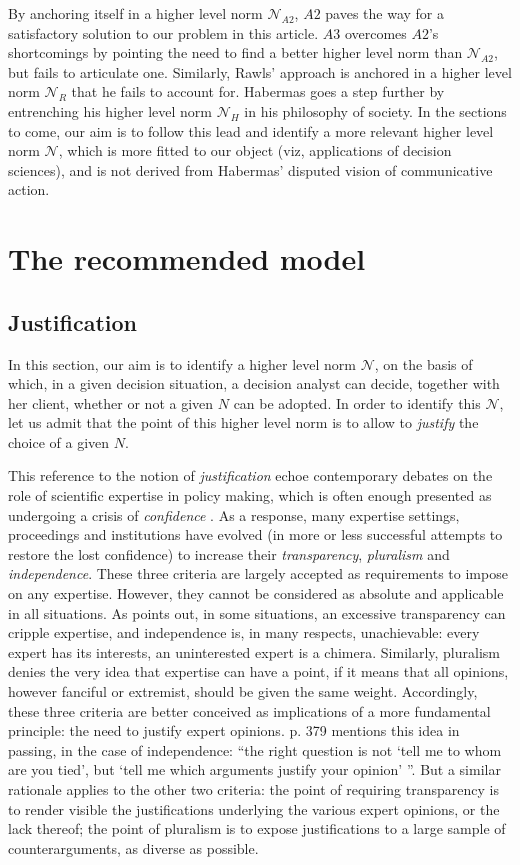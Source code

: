 \documentclass[preprint, french, english, 11pt, authoryear]{elsarticle}%
\newcommand{\adv}{\mathscr{N}}
\begin{document}
By anchoring itself in a higher level norm $\mathscr{N}_{A2}$, $A2$ paves the way for a satisfactory solution to our problem in this article. $A3$ overcomes $A2$'s shortcomings by pointing the need to find a better higher level norm than $\mathscr{N}_{A2}$, but fails to articulate one. Similarly, Rawls' approach is anchored in a higher level norm $\mathscr{N}_{R}$ that he fails to account for. Habermas goes a step further by entrenching his higher level norm $\mathscr{N}_{H}$ in his philosophy of society. In the sections to come, our aim is to follow this lead and identify a more relevant higher level norm $\adv$, which is more fitted to our object (viz, applications of decision sciences), and is not derived from Habermas' disputed vision of communicative action.

\section{The recommended model}
\subsection{Justification}
In this section, our aim is to identify a higher level norm $\adv$, on the basis of which, in a given decision situation, a decision analyst can decide, together with her client, whether or not a given $N$ can be adopted. In order to identify this $\adv$, let us admit that the point of this higher level norm is to allow to \emph{justify} the choice of a given $N$.

This reference to the notion of \emph{justification} echoe contemporary debates on the role of scientific expertise in policy making, which is often enough presented as undergoing a crisis of \emph{confidence} \citep{godard_environnement_2015}. As a response, many expertise settings, proceedings and institutions have evolved (in more or less successful attempts to restore the lost confidence) to increase their \emph{transparency}, \emph{pluralism} and \emph{independence}. These three criteria are largely accepted as requirements to impose on any expertise. However, they cannot be considered as absolute and applicable in all situations. As \citet{godard_environnement_2015} points out, in some situations, an excessive transparency can cripple expertise, and independence is, in many respects, unachievable: every expert has its interests, an uninterested expert is a chimera. Similarly, pluralism denies the very idea that expertise can have a point, if it means that all opinions, however fanciful or extremist, should be given the same weight. Accordingly, these three criteria are better conceived as implications of a more fundamental principle: the need to justify expert opinions. \citet{godard_environnement_2015} p. 379 mentions this idea in passing, in the case of independence: “the right question is not `tell me to whom are you tied', but `tell me which arguments justify your opinion' ”. But a similar rationale applies to the other two criteria: the point of requiring transparency is to render visible the justifications underlying the various expert opinions, or the lack thereof; the point of pluralism is to expose justifications to a large sample of counterarguments, as diverse as possible.
\end{document}
